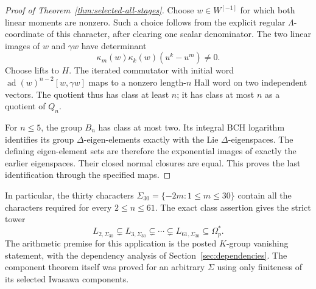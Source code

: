 \begin{proof}[Proof of Theorem~\ref{thm:selected-all-stages}]
Choose \(w\in W^{[-1]}\) for which both linear moments
are nonzero. Such a choice follows from the explicit regular
\(\Lambda\)-coordinate of this character, after clearing
one scalar denominator. The two linear images of \(w\)
and \(\gamma w\) have determinant
\[
             \kappa_m(w)\kappa_k(w)(u^k-u^m)\ne0.
\]
Choose lifts to \(H\). The iterated commutator with initial
word \(\operatorname{ad}(w)^{n-2}[w,\gamma w]\) maps to a
nonzero length-\(n\) Hall word on two independent vectors.
The quotient thus has class at least \(n\); it has class
at most \(n\) as a quotient of \(Q_n\).

For \(n\leq5\), the group \(B_n\) has class at most two.
Its integral BCH logarithm identifies its group
\(\Delta\)-eigen-elements exactly with the Lie
\(\Delta\)-eigenspaces. The defining eigen-element sets are therefore the exponential images of exactly the earlier eigenspaces. Their closed normal closures are equal. This proves the
last identification through the specified maps.
\end{proof}

In particular, the thirty characters
\(\Sigma_{30}=\{-2m:1\leq m\leq30\}\) contain all the
characters required for every \(2\leq n\leq61\).
The exact class assertion gives the strict tower
\[
 L_{2,\Sigma_{30}}\subsetneq L_{3,\Sigma_{30}}
 \subsetneq\cdots\subsetneq L_{61,\Sigma_{30}}
 \subseteq\Omega_p^*.
\]
The arithmetic premise for this application is the posted
\(K\)-group vanishing statement, with the dependency analysis
of Section~\ref{sec:dependencies}. The component theorem
itself was proved for an arbitrary \(\Sigma\) using only
finiteness of its selected Iwasawa components.
